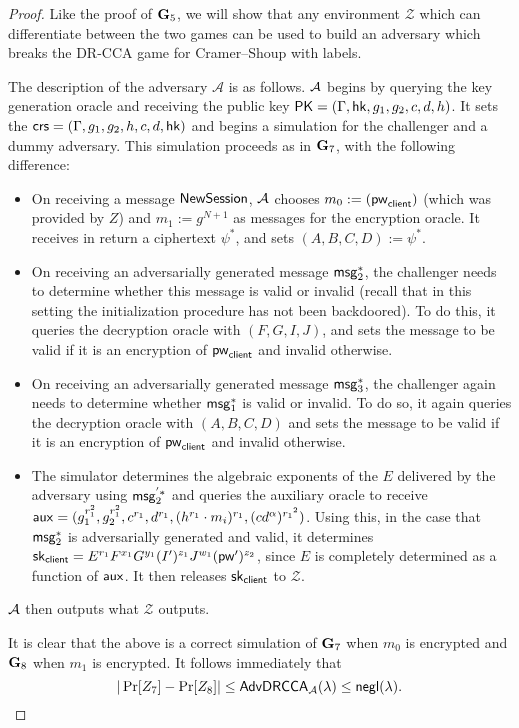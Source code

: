 \begin{proof}
	Like the proof of $\mathbf{G}_5$, we will show that any environment $\mathcal{Z}$ which can differentiate between the two games can be used to build an adversary which breaks the DR-CCA game for Cramer--Shoup with labels.
	
	The description of the adversary $\mathcal{A}$ is as follows. $\mathcal{A}$ begins by querying the key generation oracle and receiving the public key $\mathsf{PK} = (\Gamma,\mathsf{hk},g_1,g_2,c,d,h)$. It sets the $\mathsf{crs} = (\Gamma,g_1,g_2,h,c,d,\mathsf{hk})$ and begins a simulation for the challenger and a dummy adversary. This simulation proceeds as in $\mathbf{G}_7$, with the following difference:
	
	\begin{itemize}
		\item On receiving a message $\mathsf{NewSession}$, $\mathcal{A}$ chooses $m_0:=(\mathsf{pw}_{\mathsf{client}})$ (which was provided by $Z$) and $m_1:=g^{N+1}$ as messages for the encryption oracle. It receives in return a ciphertext $\psi^{*}$, and sets $(A,B,C,D):=\psi^{*}$.
		\item On receiving an adversarially generated message $\mathsf{msg}_{2}^{*}$, the challenger needs to determine whether this message is valid or invalid (recall that in this setting the initialization procedure has not been backdoored). To do this, it queries the decryption oracle with $(F,G,I,J)$, and sets the message to be valid if it is an encryption of $\mathsf{pw}_{\mathsf{client}}$ and invalid otherwise.
		\item On receiving an adversarially generated message $\mathsf{msg}_{3}^{*}$, the challenger again needs to determine whether $\mathsf{msg}_{1}^{*}$ is valid or invalid. To do so, it again queries the decryption oracle with $(A,B,C,D)$ and sets the message to be valid if it is an encryption of $\mathsf{pw}_{\mathsf{client}}$ and invalid otherwise.
		\item The simulator determines the algebraic exponents of the $E$ delivered by the adversary using $\mathsf{msg}_{2}^{'*}$ and queries the auxiliary oracle to receive $\mathsf{aux} = (g_1^{r_1^2}, g_2^{r_1^2}, c^{r_1}, d^{r_1},(h^{r_1}\cdot m_i)^{r_1},(cd^{\alpha})^{{r_1}^2})$. Using this, in the case that $\mathsf{msg}_{2}^{*}$ is adversarially generated and valid, it determines $\mathsf{sk}_{\mathsf{client}} = E^{r_1}F^{x_1}G^{y_1}(I')^{z_1}J^{w_1}(\mathsf{pw}')^{z_2}$, since $E$ is completely determined as a function of $\mathsf{aux}$. It then releases $\mathsf{sk}_{\mathsf{client}}$ to $\mathcal{Z}$.
	\end{itemize}

	$\mathcal{A}$ then outputs what $\mathcal{Z}$ outputs.
	
	It is clear that the above is a correct simulation of $\mathbf{G}_7$ when $m_0$ is encrypted and $\mathbf{G}_8$ when $m_1$ is encrypted. It follows immediately that $$|\Pr[Z_7]-\Pr[Z_8]|\leq\mathsf{AdvDRCCA}_{\mathcal{A}}(\lambda)\leq\mathsf{negl}(\lambda).$$
\end{proof}

